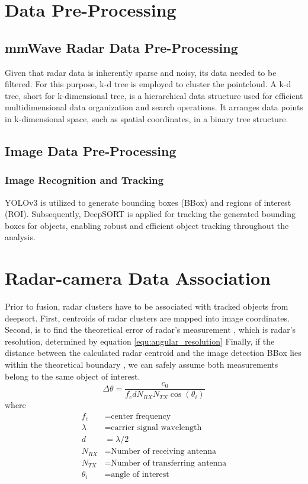 \section{Data Pre-Processing}\label{sec:2-preprocessing}
\subsection{mmWave Radar Data Pre-Processing}\label{sec:2-kd_tree}
Given that radar data is inherently sparse and noisy, its data needed to be filtered.
For this purpose, k-d tree is employed to cluster the pointcloud.
A k-d tree, short for k-dimensional tree, is a hierarchical data structure used for efficient multidimensional data organization and search operations. 
It arranges data points in k-dimensional space, such as spatial coordinates, in a binary tree structure. 

\subsection{Image Data Pre-Processing}\label{sec:2-img_recognition}
\subsubsection{Image Recognition and Tracking}
YOLOv3 is utilized to generate bounding boxes (BBox) and regions of interest (ROI)\cite{redmon2018yolov3}.
Subsequently, DeepSORT is applied for tracking the generated bounding boxes for objects, 
enabling robust and efficient object tracking throughout the analysis\cite{Wojke2017simple}.

\section{Radar-camera Data Association}\label{sec:2-association}
Prior to fusion, radar clusters have to be associated with tracked objects from deepsort.
First, centroids of radar clusters are mapped into image coordinates.
Second, is to find the theoretical error of radar's measurement \cite{8844649}, which is radar's resolution, determined by equation \ref*{equ:angular_resolution}
Finally, if the distance between the calculated radar centroid and the image detection BBox lies within the theoretical boundary
, we can safely assume both measurements belong to the same object of interest.
\begin{equation}\label{equ:angular_resolution}
    \Delta \theta= \frac{c_0}{f_c d N_{RX} N_{TX} \cos(\theta _i)}
\end{equation}
where
\begin{align*}
    f_c & = \text{center frequency} \\
    \lambda & = \text{carrier signal wavelength} \\
    d & =  \lambda/2 \\
    N_{RX} & = \text{Number of receiving antenna}\\
    N_{TX}& = \text{Number of transferring antenna}\\
    \theta _i &= \text{angle of interest}
\end{align*}

